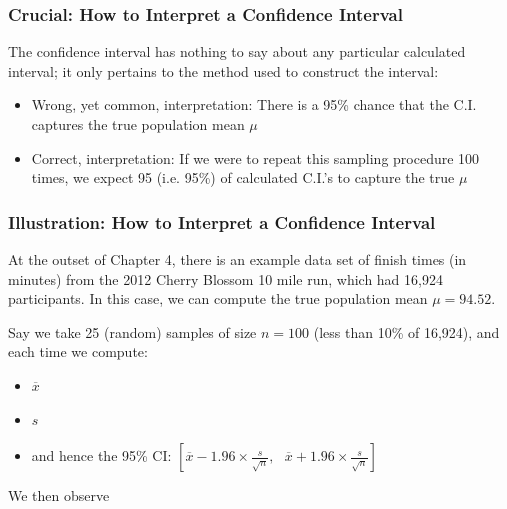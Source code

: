 \documentclass[handout]{beamer}
\newcommand{\blue}[1]{\textcolor{blue2}{#1}}
\newcommand{\xbar}{\overline{x}}
\begin{document}
\begin{frame}
\frametitle{Crucial: How to Interpret a Confidence Interval}
The confidence interval has nothing to say about any particular calculated interval; it only pertains to the \blue{method} used to construct the interval:
\vskip 0.25cm
\begin{itemize}
\pause \item\blue{Wrong, yet common, interpretation}:  There is a 95\% chance that the C.I. captures the true population mean $\mu$
\pause \item\blue{Correct, interpretation}:  If we were to repeat this sampling procedure 100 times, we expect 95 (i.e. 95\%) of calculated C.I.'s to capture the true $\mu$
\end{itemize}
 
\end{frame}


\begin{frame}
\frametitle{Illustration:  How to Interpret a Confidence Interval}
At the outset of Chapter 4, there is an example data set of finish times (in minutes) from the 2012 Cherry Blossom 10 mile run, which had 16,924 participants.  In this case, we can compute the \blue{true} population mean $\mu=94.52$.

\vspace{0.5cm}

\pause Say we take 25 (random) samples of size $n=100$ (less than 10\% of 16,924), and each time we compute:
\begin{itemize}
\item $\xbar$
\item $s$
\item and hence the 95\% CI:  $\left[
\overline{x} - 1.96 \times\frac{s}{\sqrt n}, \mbox{  }
\overline{x} + 1.96 \times\frac{s}{\sqrt n}
\right]$
\end{itemize}
\pause We then observe
\end{frame}
\end{document}
